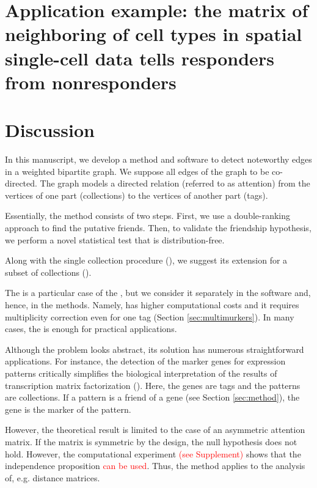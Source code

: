 \documentclass{llncs}
\begin{document}
\section{Application example: the matrix of neighboring of cell types in spatial single-cell data tells responders from nonresponders}

\section{Discussion}

In this manuscript, we develop a method and software to detect noteworthy edges in a weighted bipartite graph. We suppose all edges of the graph to be co-directed. The graph models a directed relation (referred to as attention) from the vertices of one part (collections) to the vertices of another part (tags).

Essentially, the method consists of two steps. First, we use a double-ranking approach to find the putative friends. Then, to validate the friendship hypothesis, we perform a novel statistical test that is distribution-free.

Along with the single collection procedure (), we suggest its extension for a subset of collections ().

The  is a particular case of the , but we consider it separately in the software and, hence, in the methods. Namely,  has higher computational costs and it requires multiplicity correction even for one tag (Section \ref{sec:multimurkers}). In many cases, the  is enough for practical applications. 

Although the problem looks abstract, its solution has numerous straightforward applications. For instance, the detection of the marker genes \cite{stein-obrien_patternmarkers_2017} for expression patterns critically simplifies the biological interpretation of the results of transcription matrix factorization (\cite{Stein_2018,Fertig_2016}). Here, the genes are tags and the patterns are collections. If a pattern is a friend of a gene (see Section \ref{sec:method}), the gene is the marker of the pattern.

However, the theoretical result is limited to the case of an asymmetric attention matrix. If the matrix is symmetric by the design, the null hypothesis does not hold. However, the computational experiment \textcolor{red}{(see Supplement)} shows that the independence proposition \textcolor{red}{can be used}. Thus, the method applies to the analysis of, e.g. distance matrices. 
\end{document}
